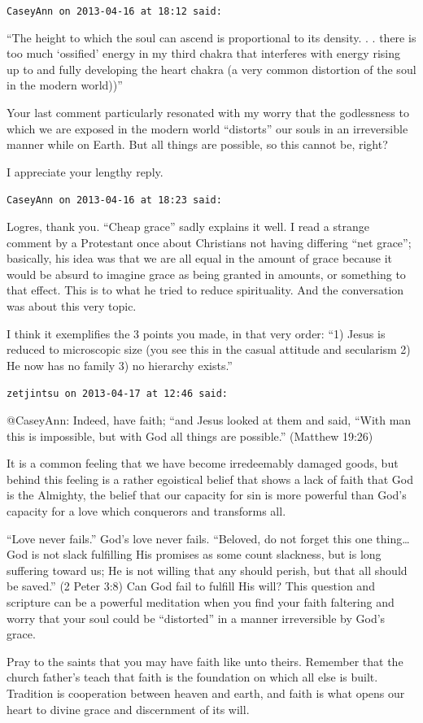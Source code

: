 \begin{footnotesize}
\begin{sffamily}
\hfill

\texttt{CaseyAnn on 2013-04-16 at 18:12 said: }

“The height to which the soul can ascend is proportional to its density. . . there is too much `ossified' energy in my third chakra that interferes with energy rising up to and fully developing the heart chakra (a very common distortion of the soul in the modern world))”

Your last comment particularly resonated with my worry that the godlessness to which we are exposed in the modern world “distorts” our souls in an irreversible manner while on Earth. But all things are possible, so this cannot be, right?

I appreciate your lengthy reply.


\hfill

\texttt{CaseyAnn on 2013-04-16 at 18:23 said: }

Logres, thank you. “Cheap grace” sadly explains it well. I read a strange comment by a Protestant once about Christians not having differing “net grace”; basically, his idea was that we are all equal in the amount of grace because it would be absurd to imagine grace as being granted in amounts, or something to that effect. This is to what he tried to reduce spirituality. And the conversation was about this very topic.

I think it exemplifies the 3 points you made, in that very order: “1) Jesus is reduced to microscopic size (you see this in the casual attitude and secularism 2) He now has no family 3) no hierarchy exists.”


\hfill

\texttt{zetjintsu on 2013-04-17 at 12:46 said: }

@CaseyAnn: Indeed, have faith; “and Jesus looked at them and said, “With man this is impossible, but with God all things are possible.” (Matthew 19:26)

It is a common feeling that we have become irredeemably damaged goods, but behind this feeling is a rather egoistical belief that shows a lack of faith that God is the Almighty, the belief that our capacity for sin is more powerful than God's capacity for a love which conquerors and transforms all. 

“Love never fails.” God's love never fails. “Beloved, do not forget this one thing… God is not slack fulfilling His promises as some count slackness, but is long suffering toward us; He is not willing that any should perish, but that all should be saved.” (2 Peter 3:8) Can God fail to fulfill His will? This question and scripture can be a powerful meditation when you find your faith faltering and worry that your soul could be “distorted” in a manner irreversible by God's grace. 

Pray to the saints that you may have faith like unto theirs. Remember that the church father's teach that faith is the foundation on which all else is built. Tradition is cooperation between heaven and earth, and faith is what opens our heart to divine grace and discernment of its will.


\end{sffamily}\end{footnotesize}
